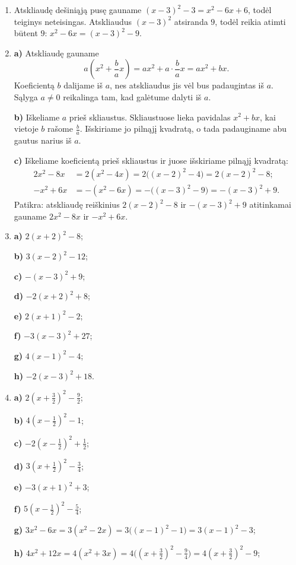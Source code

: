 \documentclass[12pt,a4paper]{article}
\begin{document}
\begin{enumerate}
\textbf{h)} $(x+\frac{\sqrt{2}}{2})^2-\frac{1}{2}$.
\item Atskliaudę dešiniąją pusę gauname $(x-3)^2-3=x^2-6x+6$, todėl teiginys neteisingas. Atskliaudus $(x-3)^2$ atsiranda $9$, todėl reikia atimti būtent $9$: $x^2-6x=(x-3)^2-9$.
\item \textbf{a)} Atskliaudę gauname
\[
a\left(x^2+\frac{b}{a}x\right)=ax^2+a\cdot\frac{b}{a}x=ax^2+bx.
\]
Koeficientą $b$ dalijame iš $a$, nes atskliaudus jis vėl bus padaugintas iš $a$. Sąlyga $a\ne0$ reikalinga tam, kad galėtume dalyti iš $a$.

\textbf{b)} Iškeliame $a$ prieš skliaustus. Skliaustuose lieka pavidalas $x^2+bx$, kai vietoje $b$ rašome $\frac{b}{a}$. Išskiriame jo pilnąjį kvadratą, o tada padauginame abu gautus narius iš $a$.

\textbf{c)} Iškeliame koeficientą prieš skliaustus ir juose išskiriame pilnąjį kvadratą:
\[
\begin{aligned}
2x^2-8x&=2(x^2-4x)=2\bigl((x-2)^2-4\bigr)=2(x-2)^2-8;\\
-x^2+6x&=-(x^2-6x)=-\bigl((x-3)^2-9\bigr)=-(x-3)^2+9.
\end{aligned}
\]
Patikra: atskliaudę reiškinius $2(x-2)^2-8$ ir $-(x-3)^2+9$ atitinkamai gauname $2x^2-8x$ ir $-x^2+6x$.
\item \textbf{a)} $2(x+2)^2-8$;

\textbf{b)} $3(x-2)^2-12$;

\textbf{c)} $-(x-3)^2+9$;

\textbf{d)} $-2(x+2)^2+8$;

\textbf{e)} $2(x+1)^2-2$;

\textbf{f)} $-3(x-3)^2+27$;

\textbf{g)} $4(x-1)^2-4$;

\textbf{h)} $-2(x-3)^2+18$.
\item \textbf{a)} $2(x+\frac{3}{2})^2-\frac{9}{2}$;

\textbf{b)} $4(x-\frac{1}{2})^2-1$;

\textbf{c)} $-2(x-\frac{1}{2})^2+\frac{1}{2}$;

\textbf{d)} $3(x+\frac{1}{2})^2-\frac{3}{4}$;

\textbf{e)} $-3(x+1)^2+3$;

\textbf{f)} $5(x-\frac{1}{2})^2-\frac{5}{4}$;

\textbf{g)} $3x^2-6x=3(x^2-2x)=3\bigl((x-1)^2-1\bigr)=3(x-1)^2-3$;

\textbf{h)} $4x^2+12x=4(x^2+3x)=4\bigl((x+\frac32)^2-\frac94\bigr)=4(x+\frac32)^2-9$;


\end{enumerate}
\end{document}
